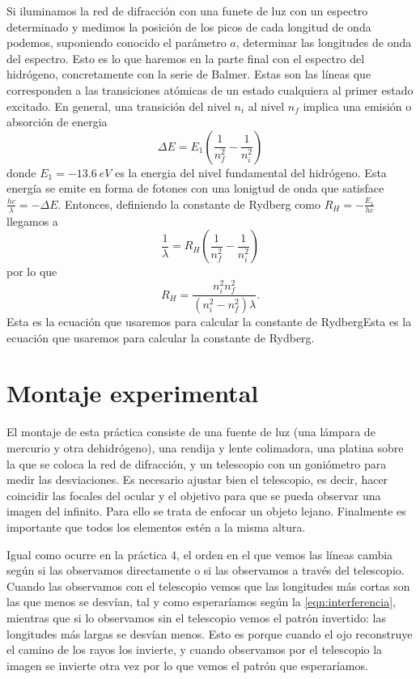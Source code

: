 \documentclass[12pt]{article}
\numberwithin{table}{section}
\numberwithin{figure}{section}
\numberwithin{equation}{section}
\begin{document}
Si iluminamos la red de difracción con una funete de luz con un espectro determinado y medimos la posición de los picos de cada longitud de onda podemos, suponiendo conocido el parámetro \( a \), determinar las longitudes de onda del espectro. Esto es lo que haremos en la parte final con el espectro del hidrógeno, concretamente con la serie de Balmer. Estas son las líneas que corresponden a las transiciones atómicas de un estado cualquiera al primer estado excitado. En general, una transición del nivel \( n_i \) al nivel \( n_f \) implica una emisión o absorción de energia
\begin{equation*}
	\Delta E = E_1\left(\frac{1}{n_f^2} - \frac{1}{n_i^2}\right)
\end{equation*}
donde \( E_1 = \SI{-13.6}{eV} \) es la energia del nivel fundamental del hidrógeno. Esta energía se emite en forma de fotones con una lonigtud de onda que satisface \( \frac{hc}{\lambda} = -\Delta E \). Entonces, definiendo la constante de Rydberg como \( R_H = -\frac{E_1}{hc} \) llegamos a
\begin{equation*}
	\frac{1}{\lambda} = R_H\left(\frac{1}{n_f^2} - \frac{1}{n_i^2}\right)
\end{equation*}
por lo que
\begin{equation} \label{eqn:rydberg}
	R_H = \frac{n_i^2n_f^2}{(n_i^2 - n_f^2)\lambda}.
\end{equation}
Esta es la ecuación que usaremos para calcular la constante de RydbergEsta es la ecuación que usaremos para calcular la constante de Rydberg.

\section{Montaje experimental}
El montaje de esta práctica consiste de una fuente de luz (una lámpara de mercurio y otra dehidrógeno), una rendija y lente colimadora, una platina sobre la que se coloca la red de difracción, y un telescopio con un goniómetro para medir las desviaciones. Es necesario ajustar bien el telescopio, es decir, hacer coincidir las focales del ocular y el objetivo para que se pueda observar una imagen del infinito. Para ello se trata de enfocar un objeto lejano. Finalmente es importante que todos los elementos estén a la misma altura.

Igual como ocurre en la práctica 4, el orden en el que vemos las líneas cambia según si las observamos directamente o si las observamos a través del telescopio. Cuando las observamos con el telescopio vemos que las longitudes más cortas son las que menos se desvían, tal y como esperaríamos según la \cref{eqn:interferencia}, mientras que si lo observamos sin el telescopio vemos el patrón invertido: las longitudes más largas se desvían menos. Esto es porque cuando el ojo reconstruye el camino de los rayos los invierte, y cuando observamos por el telescopio la imagen se invierte otra vez por lo que vemos el patrón que esperaríamos.
\end{document}
